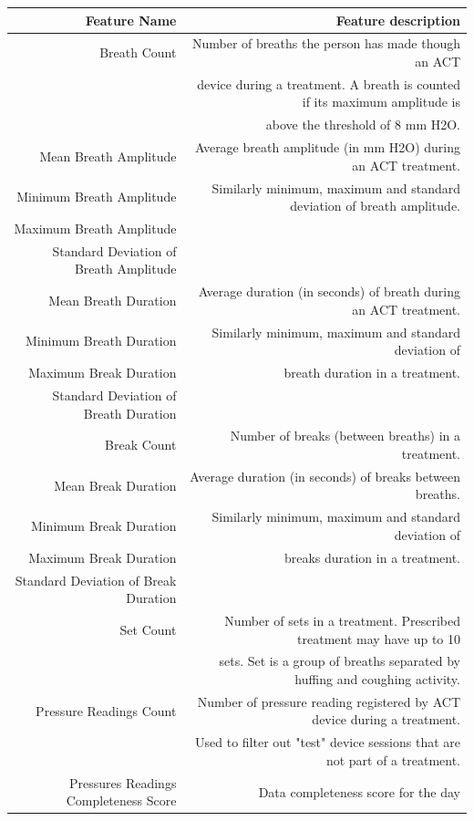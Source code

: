 \documentclass{article}
\begin{document}
\begin{longtable}{ n|d}
\toprule
\cmidrule(r){1-2}
\textbf{Feature Name} & \textbf{Feature description} \\
\midrule
Breath Count & Number of breaths the person has made though an ACT  \\ 
 ~ & device during a treatment. A breath is counted if its maximum amplitude is \\ ~ & above the threshold of 8 mm H2O.\\
 \midrule
 Mean Breath Amplitude & Average breath amplitude (in mm H2O) during an ACT treatment. \\
 Minimum Breath Amplitude & Similarly minimum, maximum and standard deviation of breath amplitude. \\
 Maximum Breath Amplitude & ~ \\
 Standard Deviation of Breath Amplitude & ~ \\
 \midrule
 Mean Breath Duration & Average duration (in seconds) of breath during an ACT treatment. \\ 
 Minimum Breath Duration &  Similarly minimum, maximum and standard deviation of \\ 
 Maximum Break Duration & breath duration in a treatment. \\
 Standard Deviation of Breath Duration & ~ \\
 \midrule
 Break Count & Number of breaks (between breaths) in a treatment. \\
 \midrule
 Mean Break Duration & Average duration (in seconds) of breaks between breaths. \\ 
 Minimum Break Duration & Similarly minimum, maximum and standard deviation of \\ 
 Maximum Break Duration & breaks duration in a treatment. \\
 Standard Deviation of Break Duration & ~ \\
 \midrule
 Set Count & Number of sets in a treatment. Prescribed treatment may have up to 10 \\
 ~ & sets. Set is a group of breaths separated by huffing and coughing activity. \\
 \midrule
 Pressure Readings Count & Number of pressure reading registered by ACT device during a treatment. \\
 ~ & Used to filter out "test" device sessions that are not part of a treatment. \\
 \midrule
 Pressures Readings Completeness Score & Data completeness score for the day \\

\end{longtable}
\end{document}
